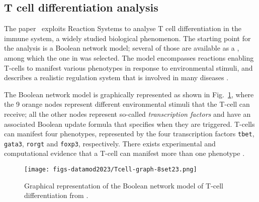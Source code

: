 

\subsection{T cell differentiation analysis}\label{sec:datamod2023}

The paper~\cite{datamod2023} exploits Reaction Systems to analyse T cell differentiation in the immune system, a widely studied biological phenomenon. The starting point for the analysis is a Boolean network model; several of those are available as a \cite{saez2007logical,thakar2010boolean,puniya2018mechanistic}, among which the one in \cite{puniya2018mechanistic} was selected. The model encompasses reactions enabling T-cells to manifest various phenotypes in response to environmental stimuli, and describes a realistic regulation system that is involved in many diseases \cite{lafaille1998role,hirahara2016cd4+,meng2016regulatory}.

The Boolean network model is graphically represented as shown in Fig.~\ref{fig:model-graph}, where the 9 orange nodes represent different environmental stimuli that the T-cell can receive; all the other nodes represent so-called \emph{transcription factors} and have an associated Boolean update formula that specifies when they are triggered. 
T-cells can manifest four phenotypes, 
represented by the four transcription factors \texttt{tbet}, \texttt{gata3}, \texttt{rorgt} and \texttt{foxp3}, respectively.
There exists experimental and computational evidence that a T-cell can manifest more than one phenotype \cite{luckheeram2012cd4+,puniya2018mechanistic}.

\begin{figure}[t]
	\begin{center}
		\texttt{[image: figs-datamod2023/Tcell-graph-8set23.png]}
	\end{center}
	\caption{Graphical representation of the Boolean network model of T-cell differentiation from \cite{puniya2018mechanistic}.}
	\label{fig:model-graph}
\end{figure}

